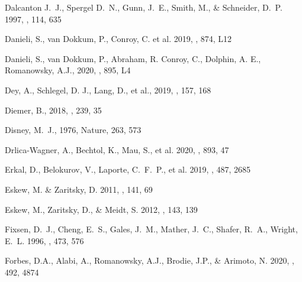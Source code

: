 \documentclass[twocolumn,tighten]{aastex63}
\begin{document}
\begin{thebibliography}{}
Dalcanton J.~J., Spergel D.~N., Gunn, J.~E., Smith, M., \& Schneider, D.~P. 1997, \aj, 114, 635

Danieli, S., van Dokkum, P., Conroy, C. et al. 2019, \apjl, 874, L12

Danieli, S., van Dokkum, P., Abraham, R. Conroy, C., Dolphin, A. E., Romanowsky, A.J., 2020, \apjl, 895, L4

Dey, A., Schlegel, D. J., Lang, D., et al., 2019, \aj, 157, 168 
         

Diemer, B., 2018, \apjs, 239, 35

Disney, M.~J., 1976, Nature, 263, 573


Drlica-Wagner, A., Bechtol, K., Mau, S., et al. 2020, \apj, 893, 47

Erkal, D., Belokurov, V., Laporte, C.~F.~P., et al. 2019, \mnras, 487, 2685

Eskew, M. \& Zaritsky, D. 2011, \aj, 141, 69
 

Eskew, M., Zaritsky, D., \& Meidt, S. 2012, \aj, 143, 139
 

Fixsen, D.~J., Cheng, E.~S., Gales, J.~M., Mather, J.~C., Shafer, R.~A., Wright, E.~L. 1996, \apj, 473, 576


Forbes, D.A., Alabi, A., Romanowsky, A.J., Brodie, J.P., \& Arimoto, N. 2020, \mnras, 492, 4874
 


\end{thebibliography}
\end{document}

